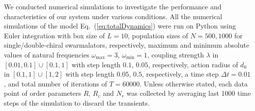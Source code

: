 \documentclass{article}
\begin{document}
We conducted numerical simulations to investigate the performance and characteristics of our system under various conditions.
All the numerical simulations of the model Eq.~(\ref{eq:totalDynamics}) were run on Python using Euler integration with box size of $L=10$, population sizes of $N=500, 1000$ for single/double-chiral swarmalators, respectively, maximum and minimum absolute values of natural frequencies $\omega_{\max}=3$, $\omega_{\min}=1$, coupling strength $\lambda$ in $\left[ 0.01, 0.1 \right] \cup \left[ 0.1, 1 \right]$ with step length $0.1$, $0.05$, respectively, action radius of $d_0$ in $\left[ 0.1, 1 \right] \cup \left[ 1, 2 \right]$ with step length $0.05$, $0.5$, respectively, a time step $\Delta t=0.01$, and total number of iterations of $T=60000$. Unless otherwise stated, each data point of order parameters $R$, $R_c$ and $N_r$ was collected by averaging last 1000 time steps of the simulation to discard the transients.
\end{document}
